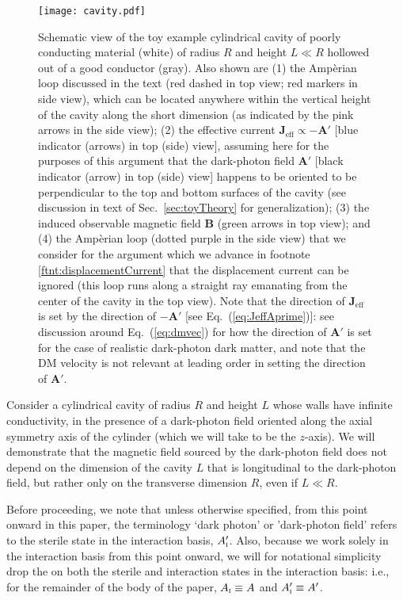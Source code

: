 \documentclass[amsmath,amssymb,aps,10pt,prd,letterpaper,nofootinbib,balancelastpage,notitlepage,superscriptaddress,twocolumn,floatfix]{revtex4-2}
\newcommand{\secref}[2][]{Sec{#1}.~\ref{#2}}		%
\renewcommand{\eqref}[2][]{Eq{#1}.~(\ref{eq:#2})}	%
\newcommand{\tsc}[1]{\textsc{#1}}
\begin{document}
\begin{figure}[!t]
\texttt{[image: cavity.pdf]}
\caption{\label{fig:cavity}%
    Schematic view of the toy example cylindrical cavity of poorly conducting material (white) of radius $R$ and height $L\ll R$ hollowed out of a good conductor (gray).
    Also shown are (1) the Amp\`erian loop discussed in the text (red dashed in top view; red markers in side view), which can be located anywhere within the vertical height of the cavity along the short dimension (as indicated by the pink arrows in the side view); (2) the effective current $\bm{J}_{\text{eff}} \propto -\bm{A'}$ [blue indicator (arrows) in top (side) view], assuming here for the purposes of this argument that the dark-photon field $\bm{A}'$ [black indicator (arrow) in top (side) view] happens to be oriented to be perpendicular to the top and bottom surfaces of the cavity (see discussion in text of \secref{sec:toyTheory} for generalization); (3) the induced observable magnetic field $\bm{B}$ (green arrows in top view); and (4) the Amp\`erian loop (dotted purple in the side view) that we consider for the argument which we advance in footnote \ref{ftnt:displacementCurrent} that the displacement current can be ignored (this loop runs along a straight ray emanating from the center of the cavity in the top view).
    Note that the direction of $\bm{J}_{\text{eff}}$ is set by the direction of $-\bm{A}'$ [see \eqref{JeffAprime}]: see discussion around \eqref{dmvec} for how the direction of $\bm{A}'$ is set for the case of realistic dark-photon dark matter, and note that the DM velocity is not relevant at leading order in setting the direction of $\bm{A}'$.%
    } 
\end{figure}

Consider a cylindrical cavity of radius $R$ and height $L$ whose walls have infinite conductivity, in the presence of a dark-photon field oriented along the axial symmetry axis of the cylinder (which we will take to be the $z$-axis).
We will demonstrate that the magnetic field sourced by the dark-photon field does not depend on the dimension  of the cavity $L$ that is longitudinal to the dark-photon field, but rather only on the transverse dimension $R$, even if $L\ll R$.

Before proceeding, we note that unless otherwise specified, from this point onward in this paper, the terminology `dark photon' or 'dark-photon field' refers to the sterile state in the interaction basis, $A'_{\tsc{i}}$.
Also, because we work solely in the interaction basis from this point onward, we will for notational simplicity drop the\linebreak  {subscript-$\tsc{i}$} on both the sterile and interaction states in the interaction basis: i.e., for the remainder of the body of the paper, $A_{\tsc{i}} \equiv A$ and $A_{\tsc{i}}' \equiv A'$.
\end{document}
